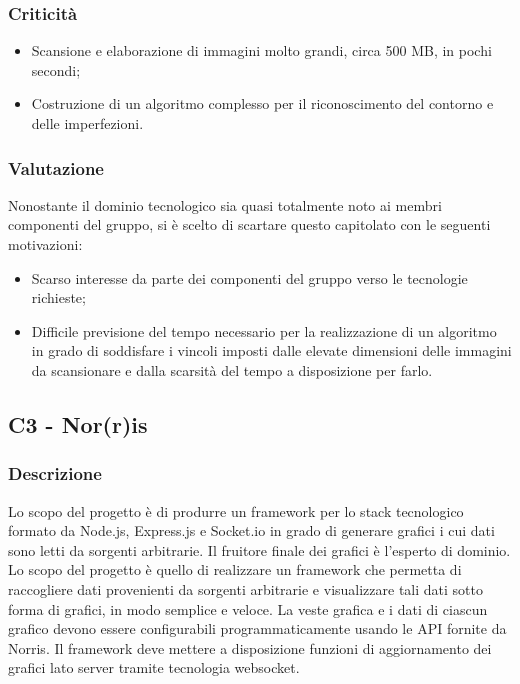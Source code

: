 \subsubsection{Criticità}

\begin{itemize}
\item Scansione e elaborazione di immagini molto grandi, circa 500 MB, in pochi secondi;
\item Costruzione di un algoritmo complesso per il riconoscimento del contorno e delle imperfezioni.
\end{itemize}

\subsubsection{Valutazione}
Nonostante il dominio tecnologico sia quasi totalmente noto ai membri componenti del gruppo, si è scelto di scartare questo capitolato con le seguenti motivazioni:
\begin{itemize}
 \item Scarso interesse da parte dei componenti del gruppo verso le tecnologie richieste;
 \item Difficile previsione del tempo necessario per la realizzazione di un algoritmo in grado di soddisfare i vincoli imposti dalle elevate dimensioni delle immagini da scansionare e dalla scarsità del tempo a disposizione per farlo.
\end{itemize}

\subsection{C3 - Nor(r)is}
\subsubsection{Descrizione}
Lo scopo del progetto è di produrre un framework per lo stack tecnologico formato da Node.js, Express.js e Socket.io in grado di generare grafici 
i cui dati sono letti da sorgenti arbitrarie. Il fruitore finale dei grafici è l'esperto di dominio.\\
Lo scopo del progetto è quello di realizzare un framework che permetta di raccogliere dati provenienti da sorgenti arbitrarie e visualizzare 
tali dati sotto forma di grafici, in modo semplice e veloce. La veste grafica e i dati di ciascun grafico devono essere configurabili 
programmaticamente usando le API fornite da Norris.
Il framework deve mettere a disposizione funzioni di aggiornamento dei grafici lato server tramite tecnologia websocket.

